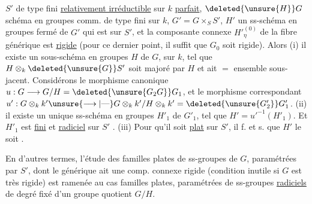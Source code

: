 \margin{\rule[-13\baselineskip]{0.35pt}{13\baselineskip}}$S'$ de type fini  \uline{relativement irréductible}
 sur $k$  \uline{parfait}, $\deleted{\unsure{H}}G$ schéma en groupes
comm. de type fini sur $k$, $G'=G\times_S S'$,
$H'$ un ss-schéma en groupes fermé
de $G'$ qui est   sur $S'$, et 
la composante connexe ${H'}^{(0)}_{\eta}$ de la fibre
générique est \uline{rigide} (pour ce dernier
point, il suffit que $G_0$ soit  rigide).
Alors (i) il existe un sous-schéma en
groupes $H$ de $G$,  sur $k$, tel que
$H\otimes_k \deleted{\unsure{G}}S'$ soit majoré par $H$ et ait $=$
ensemble sous-jacent. 
  Considérons  le morphisme
canonique $u:G\longrightarrow G/H=\deleted{\unsure{G_2 G}}G_1$, et le
morphisme correspondant 
$u':G\otimes_k k'\unsure{\longrightarrow|\text{---}}G\otimes_k k'/H\otimes_k k'=\deleted{\unsure{G'_2}}G'_1$. (ii)  il
\margin{\rule[-4\baselineskip]{0.35pt}{4\baselineskip}}existe un unique ss-schéma en groupes 
$H'_1$ de $G'_1$, tel que $H'={u'}^{-1}(H'_1)$.  Et $H'_1$ est  \uline{fini}  et \uline{radiciel}
sur $S'$ .
(iii) Pour qu'il soit \uline{plat} sur $S'$, il f. et s. que $H'$ le soit \unsure{$\varnothing$|$\varphi$}.

En d'autres termes, l'étude des
 familles plates de ss-groupes
de $G$, paramétrées par $S'$, dont le
 générique ait une comp. connexe
rigide (condition inutile si $G$ est
très rigide) est ramenée au cas 
 familles plates, paramétrées
 de ss-groupes \uline{radiciels} de
degré fixé d'un groupe quotient
$G/H$. 


